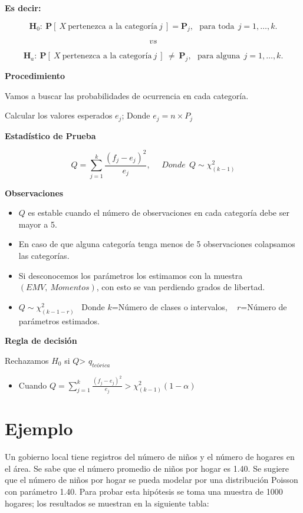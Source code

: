 \documentclass[
  a4paper,
  oneside,
  openany]{book}
\providecommand{\tightlist}{%
  \setlength{\itemsep}{0pt}\setlength{\parskip}{0pt}}
\begin{document}
\textbf{Es decir:}

\[\textbf{H}_0: \ \mathbf{P}[\ X \ \mbox{pertenezca a la categoría} \ j \ ] = \mathbf{P}_{j},\ \ \ \mbox{para toda} \ \  j=1,\ldots,k.\]

\[vs\]

\[\textbf{H}_a: \ \mathbf{P}[ \ X \ \mbox{pertenezca a la categoría} \ j \ ] \  \neq \  \mathbf{P}_{j}, \ \ \ \mbox{para alguna} \ \ j=1,\ldots,k.\]

\textbf{Procedimiento}

Vamos a buscar las probabilidades de ocurrencia en cada categoría.

Calcular los valores esperados \(e_{j}\); Donde \(e_{j}=n \times P_{j}\)

\textbf{Estadístico de Prueba}

\[Q= \sum_{j=1}^{k}\frac{(f_{j}-e_{j})^2}{e_{j}}, \ \ \ \ \ \ Donde\ \ Q \sim \chi^2_{(k-1)}\]

\textbf{Observaciones}

\begin{itemize}
\item
  \(Q\) es estable cuando el número de observaciones en cada categoría debe ser mayor a 5.
\item
  En caso de que alguna categoría tenga menos de 5 observaciones colapsamos las categorías.
\item
  Si desconocemos los parámetros los estimamos con la muestra \((EMV,\  Momentos)\), con esto se van perdiendo grados de libertad.
\item
  \(Q \sim \chi^2_{(k-1-r)}\) ~Donde \(k\)=Número de clases o intervalos, ~ \(r\)=Número de parámetros estimados.
\end{itemize}

\textbf{Regla de decisión}

Rechazamos \(H_0\) si \(Q\)\textgreater{} \(q_{teórica}\)

\begin{itemize}
\tightlist
\item
  Cuando \(Q= \sum_{j=1}^{k}\frac{(f_{j}-e_{j})^2}{e_{j}} > \chi^2_{(k-1)}(1-\alpha)\)
\end{itemize}

\hypertarget{ejemplo-10}{%
\section{Ejemplo}\label{ejemplo-10}}

Un gobierno local tiene registros del número de niños y el número de hogares en el área. Se sabe que el número promedio de niños por hogar es 1.40. Se sugiere que el número de niños por hogar se pueda modelar por una distribución Poisson con parámetro 1.40.
Para probar esta hipótesis se toma una muestra de 1000 hogares; los resultados se muestran en la siguiente tabla:
\end{document}
